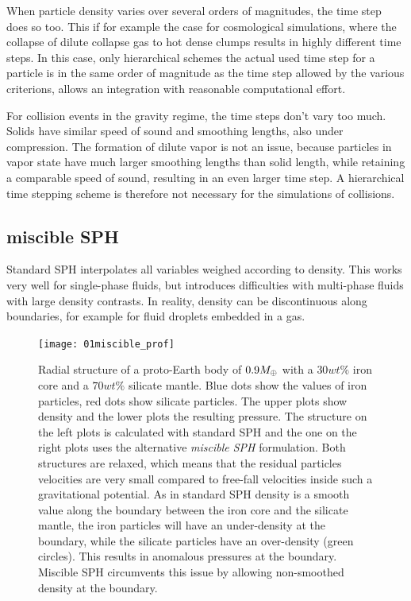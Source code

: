 When particle density varies over several orders of magnitudes, the time step does so too. This if for example the case for cosmological simulations, where the collapse of dilute collapse gas to hot dense clumps results in highly different time steps. In this case, only hierarchical schemes the actual used time step for a particle is in the same order of magnitude as the time step allowed by the various criterions, allows an integration with reasonable computational effort.

For collision events in the gravity regime, the time steps don't vary too much. Solids have similar speed of sound and smoothing lengths, also under compression. The formation of dilute vapor is not an issue, because particles in vapor state have much larger smoothing lengths than solid length, while retaining a comparable speed of sound, resulting in an even larger time step. A hierarchical time stepping scheme is therefore not necessary for the simulations of collisions.

\subsection{miscible SPH}
Standard SPH interpolates all variables weighed according to density. This works very well for single-phase fluids, but introduces difficulties with multi-phase fluids with large density contrasts. In reality, density can be discontinuous along boundaries, for example for fluid droplets embedded in a gas. 

\begin{figure}[htbp]
\begin{center}
\texttt{[image: 01miscible\_prof]}
\caption{Radial structure of a proto-Earth body of $0.9M_{\oplus}$ with a $30wt\%$ iron core and a $70wt\%$ silicate mantle. Blue dots show the values of iron particles, red dots show silicate particles. The upper plots show density and the lower plots the resulting pressure. The structure on the left plots is calculated with standard SPH and the one on the right plots uses the alternative \emph{miscible SPH} formulation. Both structures are relaxed, which means that the residual particles velocities are very small compared to free-fall velocities inside such a gravitational potential. As in standard SPH density is a smooth value along the boundary between the iron core and the silicate mantle, the iron particles will have an under-density at the boundary, while the silicate particles have an over-density (green circles). This results in anomalous pressures at the boundary. Miscible SPH circumvents this issue by allowing non-smoothed density at the boundary.}
\label{ch02_fig01}
\end{center}
\end{figure}

